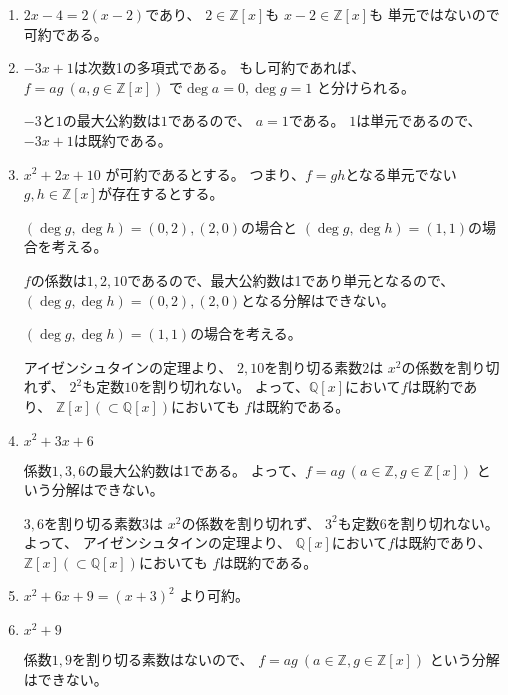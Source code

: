 \documentclass[12pt,b5paper]{ltjsarticle}
\begin{document}
\begin{enumerate}
 \item
      $2x-4=2(x-2)$であり、
      $2\in\mathbb{Z}[x]$も
      $x-2\in\mathbb{Z}[x]$も
      単元ではないので
      可約である。

 \item
      $-3x+1$は次数1の多項式である。
      もし可約であれば、
      $f=ag \ (a,g\in\mathbb{Z}[x])$
      で$\deg{a}=0,\deg{g}=1$
      と分けられる。

      $-3$と$1$の最大公約数は$1$であるので、
      $a=1$である。
      $1$は単元であるので、
      $-3x+1$は既約である。

 \item
      $x^2 + 2x + 10$
      が可約であるとする。
      つまり、$f=gh$となる単元でない$g,h\in\mathbb{Z}[x]$が存在するとする。

      $(\deg{g},\deg{h})=(0,2),(2,0)$の場合と
      $(\deg{g},\deg{h})=(1,1)$の場合を考える。

      $f$の係数は$1,2,10$であるので、最大公約数は1であり単元となるので、
      $(\deg{g},\deg{h})=(0,2),(2,0)$となる分解はできない。

      $(\deg{g},\deg{h})=(1,1)$の場合を考える。

      アイゼンシュタインの定理より、
      $2,10$を割り切る素数$2$は
      $x^2$の係数を割り切れず、
      $2^2$も定数$10$を割り切れない。
      よって、$\mathbb{Q}[x]$において$f$は既約であり、
      $\mathbb{Z}[x] (\subset \mathbb{Q}[x])$においても
      $f$は既約である。

 \item
      $x^2 + 3x + 6$

      係数$1,3,6$の最大公約数は1である。
      よって、$f=ag \ (a\in\mathbb{Z},g\in\mathbb{Z}[x])$
      という分解はできない。

      $3,6$を割り切る素数$3$は
      $x^2$の係数を割り切れず、
      $3^2$も定数$6$を割り切れない。
      よって、
      アイゼンシュタインの定理より、
      $\mathbb{Q}[x]$において$f$は既約であり、
      $\mathbb{Z}[x] (\subset \mathbb{Q}[x])$においても
      $f$は既約である。

 \item
      $x^2 + 6x + 9 = (x+3)^2$
      より可約。

 \item
      $x^2 + 9$

      係数$1,9$を割り切る素数はないので、
      $f=ag \ (a\in\mathbb{Z},g\in\mathbb{Z}[x])$
      という分解はできない。


\end{enumerate}
\end{document}
